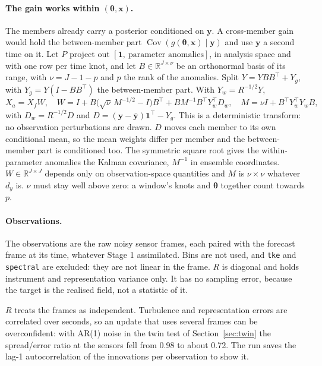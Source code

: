 \documentclass[11pt,a4paper]{article}
\newcommand{\T}{^{\top}}
\newcommand{\R}{\mathbb{R}}
\begin{document}
\paragraph{The gain works within $(\bm\theta, \bm x)$.} The members already
carry a posterior conditioned on $\bm y$. A cross-member gain would hold the
between-member part $\operatorname{Cov}(g(\bm\theta,\bm x)\mid\bm y)$ and use
$\bm y$ a second time on it. Let $P$ project out $[\bm 1,\ \text{parameter
anomalies}]$, in analysis space and with one row per time knot, and let
$B \in \R^{J\times\nu}$ be an orthonormal basis of its range, with
$\nu = J - 1 - p$ and $p$ the rank of the anomalies. Split
$Y = YBB\T + Y_g$, with $Y_g = Y(I - BB\T)$ the between-member part. With
$Y_w = R^{-1/2}Y$,
\begin{equation}
  X_a = X_f W,
  \quad
  W = I + B\big(\sqrt{\nu}\,M^{-1/2} - I\big)B\T
      + B M^{-1} B\T Y_w\T D_w,
  \quad
  M = \nu I + B\T Y_w\T Y_w B,
  \label{eq:es}
\end{equation}
with $D_w = R^{-1/2}D$ and $D = (\bm y - \bar{\bm y})\bm 1\T - Y_g$. This is a
deterministic transform: no observation perturbations are drawn. $D$ moves each
member to its own conditional mean, so the mean weights differ per member and
the between-member part is conditioned too. The symmetric square root gives the
within-parameter anomalies the Kalman covariance, $M^{-1}$ in ensemble
coordinates. $W \in \R^{J\times J}$ depends only on observation-space
quantities and $M$ is $\nu\times\nu$ whatever $d_y$ is. $\nu$ must stay
well above zero: a window's knots and $\bm\theta$ together count towards $p$.

\paragraph{Observations.} The observations are the raw noisy sensor frames, each
paired with the forecast frame at its time, whatever Stage 1 assimilated. Bins
are not used, and \texttt{tke} and \texttt{spectral} are excluded: they are not
linear in the frame. $R$ is diagonal and holds instrument and representation
variance only. It has no sampling error, because the target is the realised
field, not a statistic of it.

$R$ treats the frames as independent. Turbulence and representation errors
are correlated over seconds, so an update that uses several frames can be
overconfident: with AR(1) noise in the twin test of Section~\ref{sec:twin} the
spread/error ratio at the sensors fell from 0.98 to about 0.72. The run saves the lag-1
autocorrelation of the innovations per observation to show it.
\end{document}
